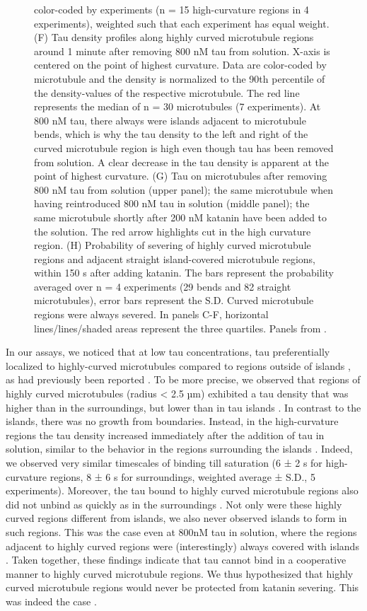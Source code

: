 \begin{figure}[h!]
{color-coded by experiments (n = 15 high-curvature regions in 4 experiments), weighted such that each experiment has equal weight. (F) Tau density profiles along highly curved microtubule regions around 1 minute after removing 800 nM tau from solution. X-axis is centered on the point of highest curvature. Data are color-coded by microtubule and the density is normalized to the 90th percentile of the density-values of the respective microtubule. The red line represents the median of n = 30 microtubules (7 experiments). At 800 nM tau, there always were islands adjacent to microtubule bends, which is why the tau density to the left and right of the curved microtubule region is high even though tau has been removed from solution. A clear decrease in the tau density is apparent at the point of highest curvature. (G) Tau on microtubules after removing 800 nM tau from solution (upper panel); the same microtubule when having reintroduced 800 nM tau in solution (middle panel); the same microtubule shortly after 200 nM katanin have been added to the solution. The red arrow highlights cut in the high curvature region. (H) Probability of severing of highly curved microtubule regions and adjacent straight island-covered microtubule regions, within 150 s after adding katanin. The bars represent the probability averaged over n = 4 experiments (29 bends and 82 straight microtubules), error bars represent the S.D. Curved microtubule regions were always severed. In panels C-F, horizontal lines/lines/shaded areas represent the three quartiles. Panels from \cite{Siahaan2019a}.
	}\label{taucurve}
\end{figure}
In our assays, we noticed that at low tau concentrations, tau preferentially localized to highly-curved microtubules compared to regions outside of islands , as had previously been reported \parencite{Samsonov2004}. To be more precise, we observed that regions of highly curved microtubules (radius < 2.5 µm) exhibited a tau density that was higher than in the surroundings, but lower than in tau islands . In contrast to the islands, there was no growth from boundaries. Instead, in the high-curvature regions the tau density increased immediately after the addition of tau in solution, similar to the behavior in the regions surrounding the islands . Indeed, we observed very similar timescales of binding till saturation (6 ± 2 s for high-curvature regions, 8 ± 6 s for surroundings, weighted average ± S.D., 5 experiments). Moreover, the tau bound to highly curved microtubule regions also did not unbind as quickly as in the surroundings . Not only were these highly curved regions different from islands, we also never observed islands to form in such regions. This was the case even at 800nM tau in solution, where the regions adjacent to highly curved regions were (interestingly) always covered with islands . Taken together, these findings indicate that tau cannot bind in a cooperative manner to highly curved microtubule regions. We thus hypothesized that highly curved microtubule regions would never be protected from katanin severing. This was indeed the case .